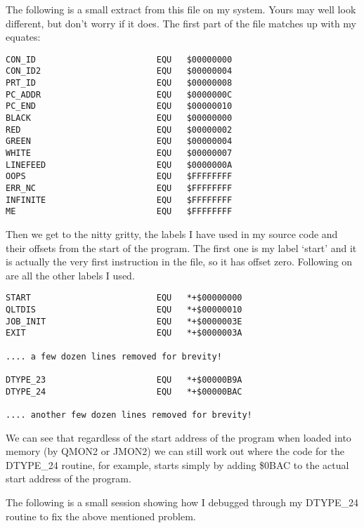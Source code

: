 \begin{appendix}
The following is a small extract from this file on my system. Yours may well
look different, but don't worry if it does. The first part of the file matches
up with my equates:

\begin{lstlisting}[firstnumber=1,caption={QLTdis Symbol List}]
CON_ID                        EQU   $00000000
CON_ID2                       EQU   $00000004
PRT_ID                        EQU   $00000008
PC_ADDR                       EQU   $0000000C
PC_END                        EQU   $00000010
BLACK                         EQU   $00000000
RED                           EQU   $00000002
GREEN                         EQU   $00000004
WHITE                         EQU   $00000007
LINEFEED                      EQU   $0000000A
OOPS                          EQU   $FFFFFFFF
ERR_NC                        EQU   $FFFFFFFF
INFINITE                      EQU   $FFFFFFFF
ME                            EQU   $FFFFFFFF
\end{lstlisting}

Then we get to the nitty gritty, the labels I have used in my source code and
their offsets from the start of the program. The first one is my label `start'
and it is actually the very first instruction in the file, so it has offset
zero. Following on are all the other labels I used.

\begin{lstlisting}[firstnumber=1,caption={QLTdis Symbol List}]
START                         EQU   *+$00000000
QLTDIS                        EQU   *+$00000010
JOB_INIT                      EQU   *+$0000003E
EXIT                          EQU   *+$0000003A

.... a few dozen lines removed for brevity!

DTYPE_23                      EQU   *+$00000B9A
DTYPE_24                      EQU   *+$00000BAC

.... another few dozen lines removed for brevity!

\end{lstlisting}


We can see that regardless of the start address of the program when loaded
into memory (by QMON2 or JMON2) we can still work out where the code for the
DTYPE\_24 routine, for example, starts simply by adding \$0BAC to the actual start
address of the program.

The following is a small session showing how I debugged through my DTYPE\_24
routine to fix the above mentioned problem. 


\end{appendix}
